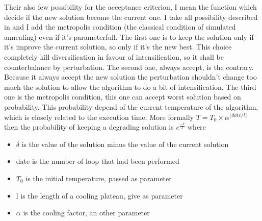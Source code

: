 \documentclass[12pt,a4paper]{article}
\begin{document}
Their also few possibility for the acceptance criterion, I mean the function which decide if the new solution become the current one. I take all possibility described in \cite{Pan201231} and I add the metropolis condition (the classical condition of simulated annealing) even if it's parameterfull. The first one is to keep the solution only if it's improve the current solution, so only if it's the new best. This choice completely kill diversification in favour of intensification, so it shall be counterbalance by perturbation. The second one, always accept, is the contrary. Because it always accept the new solution the perturbation shouldn’t change too much the solution to allow the algorithm to do a bit of intensification. The third one is the metropolis condition, this one can accept worst solution based on probability. This probability depend of the current temperature of the algorithm, which is closely related to the execution time. More formally $T = T_0 \times \alpha^{\lfloor date/l \rfloor}$ then the probability of keeping a degrading solution is $e^{ \frac{-\delta}{T}}$ where
\begin{itemize}
\item
$\delta$ is the value of the solution minus the value of the current solution
\item
date is the number of loop that had been performed
\item
$T_0$ is the initial temperature, passed as parameter
\item
l is the length of a cooling plateau, give as parameter
\item
$\alpha$ is the cooling factor, an other parameter
\end{itemize}
\end{document}
